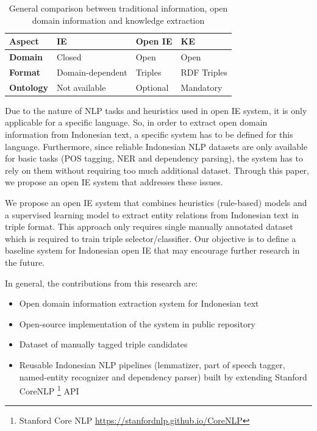 \documentclass[conference,compsoc,12pt]{IEEEtran}
\begin{document}
\begin{table}
\renewcommand{\arraystretch}{1.5}
\caption{General comparison between traditional information, open domain information and knowledge extraction}
\label{table_paradigm_comparison}
\centering
\begin{tabular}{l >{\centering\arraybackslash}p{1.9cm} >{\centering\arraybackslash}p{1.9cm} >{\centering\arraybackslash}p{1.9cm}}
\hline 
\textbf{Aspect} & \textbf{IE} & \textbf{Open IE} & \textbf{KE} \\ 
\hline 
\textbf{Domain} & Closed & Open & Open \\ 
\textbf{Format} & Domain-dependent & Triples & RDF Triples \\ 
\textbf{Ontology} & Not available & Optional & Mandatory \\ 
\hline 
\end{tabular} 
\end{table}

Due to the nature of NLP tasks and heuristics used in open IE system, it is only applicable for a specific language\cite{banko2007open}. So, in order to extract open domain information from Indonesian text, a specific system has to be defined for this language. Furthermore, since reliable Indonesian NLP datasets are only available for basic tasks (POS tagging, NER and dependency parsing), the system has to rely on them without requiring too much additional dataset. Through this paper, we propose an open IE system that addresses these issues.

We propose an open IE system that combines heuristics (rule-based) models and a supervised learning model to extract entity relations from Indonesian text in triple format. This approach only requires single manually annotated dataset which is required to train triple selector/classifier. Our objective is to define a baseline system for Indonesian open IE that may encourage further research in the future.

In general, the contributions from this research are:

\begin{itemize}
\item Open domain information extraction system for Indonesian text
\item Open-source implementation of the system in public repository
\item Dataset of manually tagged triple candidates
\item Reusable Indonesian NLP pipelines (lemmatizer, part of speech tagger, named-entity recognizer and dependency parser) built by extending Stanford CoreNLP \footnote{Stanford Core NLP \url{https://stanfordnlp.github.io/CoreNLP}} API
\end{itemize}
\end{document}

